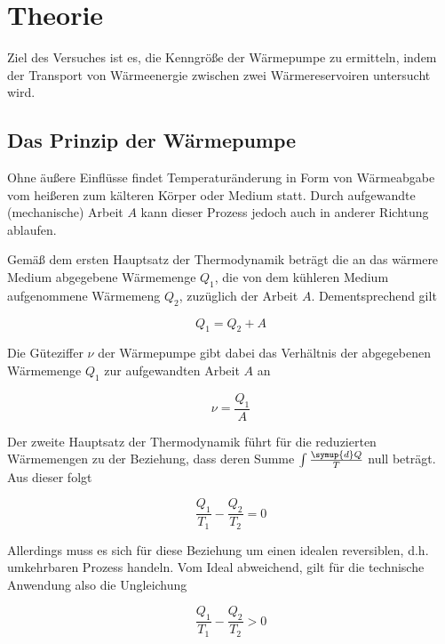 \section{Theorie}
\label{sec:Theorie}

Ziel des Versuches ist es, die Kenngröße der Wärmepumpe zu 
ermitteln, indem der Transport von Wärmeenergie zwischen
zwei Wärmereservoiren untersucht wird.

\subsection{Das Prinzip der Wärmepumpe}

Ohne äußere Einflüsse findet Temperaturänderung in Form von Wärmeabgabe
vom heißeren zum kälteren Körper oder Medium statt. Durch aufgewandte 
(mechanische) Arbeit $A$ kann dieser Prozess jedoch auch in anderer
Richtung ablaufen. 

Gemäß dem ersten Hauptsatz der Thermodynamik beträgt 
die an das wärmere Medium abgegebene Wärmemenge $Q_1$, die von dem kühleren 
Medium aufgenommene Wärmemeng $Q_2$, zuzüglich der Arbeit $A$. Dementsprechend gilt

\begin{equation}
    Q_1 = Q_2 + A
    \label{eqn:Wärm}
\end{equation}

Die Güteziffer $\nu$ der Wärmepumpe gibt dabei das Verhältnis der abgegebenen 
Wärmemenge $Q_1$ zur aufgewandten Arbeit $A$ an

\begin{equation}
    \nu = \frac{Q_1}{A}
    \label{eqn:Güte}
\end{equation}

Der zweite Hauptsatz der Thermodynamik führt für die reduzierten Wärmemengen 
zu der Beziehung, dass deren Summe $\int \frac{\symup{d}Q}{T}$ null beträgt. 
Aus dieser folgt

\begin{equation}
    \frac{Q_1}{T_1} - \frac{Q_2}{T_2} = 0
    \label{eqn:redWärm}
\end{equation}

Allerdings muss es sich für diese Beziehung um einen idealen reversiblen, d.h. 
umkehrbaren Prozess handeln. Vom Ideal abweichend, gilt für die technische 
Anwendung also die Ungleichung

\begin{equation}
    \frac{Q_1}{T_1} - \frac{Q_2}{T_2} > 0
    \label{eqn:ungWärme}
\end{equation}

